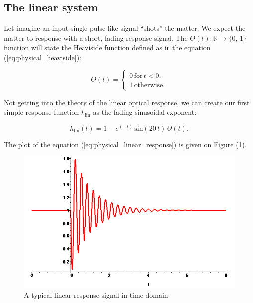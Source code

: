 \documentclass[12pt,twoside,a4paper]{article}
\numberwithin{equation}{subsection}
\numberwithin{figure}{subsection}
\begin{document}
\subsection{The linear system} \label{chap:physical_linearsystem}

Let imagine an input single pulse-like signal ``shots'' the matter. We expect the matter to response with a short, fading response signal.
The $ \Theta (t) : \mathbb{R} \rightarrow \{0, \, 1 \} $ function will state the Heaviside function defined as in the equation
(\ref{eq:physical_heaviside}):

\begin{equation} \label{eq:physical_heaviside}
   \Theta(t)  =  
   \begin{cases}
     0 \, \text{for} \, t < 0, \\
     1 \, \text{otherwise}.
   \end{cases}
\end{equation}

Not getting into the theory of the linear optical response, we can create our first simple response function $ h_{\text{lin}} $ as the
fading sinusoidal exponent:

\begin{equation} \label{eq:physical_linear_response}
  h_{\text{lin}} (t) = 1 - e^{( - t)}\,\mathrm{sin}(20\,t)\,\Theta (t) .
\end{equation}

The plot of the equation (\ref{eq:physical_linear_response}) is given on Figure (\ref{fig:physical_linplot}).

\begin{figure}[H]
  \includegraphics[width=150mm]{img/lin_plot.png}
  \caption{A typical linear response signal in time domain \label{fig:physical_linplot}}
\end{figure}
\end{document}
